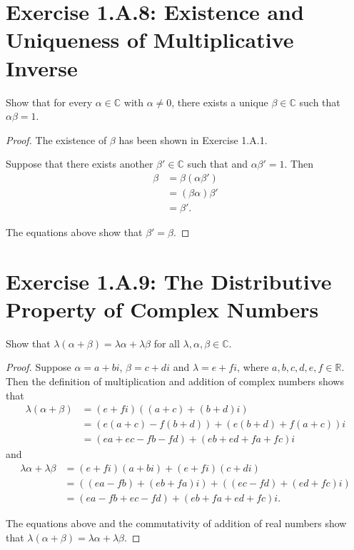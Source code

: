 \section{Exercise 1.A.8: Existence and Uniqueness of Multiplicative Inverse}
Show that for every $\alpha\in\mathbb{C}$ with $\alpha\ne 0$, there exists a unique $\beta\in\mathbb{C}$ such that $\alpha\beta=1$.
\begin{proof}
The existence of $\beta$ has been shown in Exercise 1.A.1.

Suppose that there exists another $\beta'\in\mathbb{C}$ such that and $\alpha\beta'=1$. Then
\begin{equation*}
\begin{split}
\beta&=\beta(\alpha\beta')\\
&=(\beta\alpha)\beta'\\
&=\beta'.
\end{split}
\end{equation*}

The equations above show that $\beta'=\beta$.
\end{proof}

\section{Exercise 1.A.9: The Distributive Property of Complex Numbers}
Show that $\lambda(\alpha+\beta)=\lambda\alpha+\lambda\beta$ for all $\lambda,\alpha,\beta\in\mathbb{C}$.
\begin{proof}
Suppose $\alpha=a+bi$, $\beta=c+di$ and $\lambda=e+fi$, where $a,b,c,d,e,f\in\mathbb{R}$. Then the definition of multiplication and addition of complex numbers shows that
\begin{equation*}
\begin{split}
\lambda(\alpha+\beta)&=(e+fi)((a+c)+(b+d)i)\\
&=(e(a+c)-f(b+d))+(e(b+d)+f(a+c))i\\
&=(ea+ec-fb-fd)+(eb+ed+fa+fc)i
\end{split}
\end{equation*}
and
\begin{equation*}
\begin{split}
\lambda\alpha+\lambda\beta&=(e+fi)(a+bi)+(e+fi)(c+di)\\
&=((ea-fb)+(eb+fa)i)+((ec-fd)+(ed+fc)i)\\
&=(ea-fb+ec-fd)+(eb+fa+ed+fc)i.
\end{split}
\end{equation*}

The equations above and the commutativity of addition of real numbers show that $\lambda(\alpha+\beta)=\lambda\alpha+\lambda\beta$.
\end{proof}


